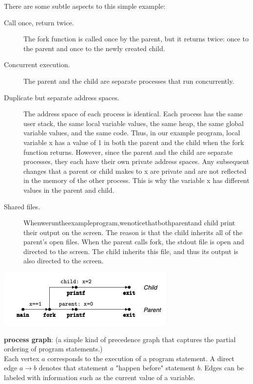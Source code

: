 \documentclass[11pt]{article}
\begin{document}
There are some subtle aspects to this simple example:\\
\begin{description}
\item[{Call once, return twice.}] The fork function is called once by the parent, but it returns twice: once to the parent and once to the newly created child.\\
\item[{Concurrent execution.}] The parent and the child are separate processes that run concurrently.\\
\item[{Duplicate but separate address spaces.}] The address space of each process is identical. Each process has the same user stack, the same local variable values, the same heap, the same global variable values, and the same code. Thus, in our example program, local variable x has a value of 1 in both the parent and the child when the fork function returns. However, since the parent and the child are separate processes, they each have their own private address spaces. Any subsequent changes that a parent or child makes to x are private and are not reflected in the memory of the other process. This is why the variable x has different values in the parent and child.\\
\item[{Shared files.}] Whenweruntheexampleprogram,wenoticethatbothparentand child print their output on the screen. The reason is that the child inherits all of the parent’s open files. When the parent calls fork, the stdout file is open and directed to the screen. The child inherits this file, and thus its output is also directed to the screen.\\
\end{description}


\begin{center}
\includegraphics[width=.9\linewidth]{pics/figure8.16-process-graph.png}
\end{center}

\textbf{process graph}: (a simple kind of precedence graph that captures the partial ordering of program statements.)\\
Each vertex \(a\) corresponds to the execution of a program statement. A direct edge \(a \rightarrow b\) denotes that statement \(a\) "happen before" statement \(b\). Edges can be labeled with information such as the current value of a variable.\\
\end{document}
